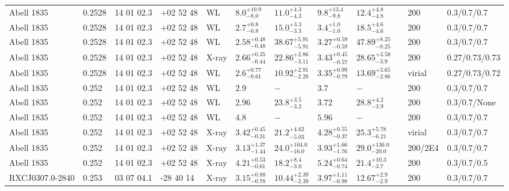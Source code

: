\begin{landscape}
\begin{center}
{\begin{longtable}{llllllllllll}
Abell 1835 & 0.2528 & 14 01 02.3 & +02 52 48 & WL & ${8.0}^{+10.9}_{-8.0}$ & ${11.0}^{+4.3}_{-4.3}$ & ${9.8}^{+13.4}_{-9.8}$ & ${12.4}^{+4.8}_{-4.8}$ & \citet{CO09.1} & 200 & 0.3/0.7/0.7 \\
Abell 1835 & 0.2528 & 14 01 02.3 & +02 52 48 & WL & ${2.7}^{+0.8}_{-0.8}$ & ${15.0}^{+3.3}_{-3.3}$ & ${3.4}^{+1.0}_{-1.0}$ & ${18.5}^{+4.6}_{-4.6}$ & \citet{SE14.1} & 200 & 0.3/0.7/0.7 \\
Abell 1835 & 0.2528 & 14 01 02.3 & +02 52 48 & WL & ${2.58}^{+0.48}_{-0.48}$ & ${38.67}^{+5.91}_{-5.91}$ & ${3.27}^{+0.59}_{-0.59}$ & ${47.89}^{+8.25}_{-8.25}$ & \citet{BA07.1} & 200 & 0.3/0.7/0.7 \\
Abell 1835 & 0.2528 & 14 01 02.3 & +02 52 48 & X-ray & ${2.66}^{+0.35}_{-0.44}$ & ${22.86}^{+2.86}_{-3.11}$ & ${3.43}^{+0.45}_{-0.57}$ & ${28.65}^{+3.58}_{-3.9}$ & \citet{BA14.1} & 200 & 0.27/0.73/0.73 \\
Abell 1835 & 0.2528 & 14 01 02.3 & +02 52 48 & WL & ${2.6}^{+0.77}_{-0.61}$ & ${10.92}^{+2.91}_{-2.28}$ & ${3.35}^{+0.99}_{-0.79}$ & ${13.69}^{+3.65}_{-2.86}$ & \citet{OK10.1} & virial & 0.27/0.73/0.72 \\
Abell 1835 & 0.252 & 14 01 02.3 & +02 52 48 & WL & ${2.9}^{}_{}$ & ${-}^{}_{}$ & ${3.7}^{}_{}$ & ${-}^{}_{}$ & \citet{CL03.1} & 200 & 0.3/0.7/0.7 \\
Abell 1835 & 0.252 & 14 01 02.3 & +02 52 48 & WL & ${2.96}^{}_{}$ & ${23.8}^{+3.5}_{-3.2}$ & ${3.72}^{}_{}$ & ${28.8}^{+4.2}_{-3.9}$ & \citet{CL02.1} & 200 & 0.3/0.7/None \\
Abell 1835 & 0.252 & 14 01 02.3 & +02 52 48 & WL & ${4.8}^{}_{}$ & ${-}^{}_{}$ & ${5.96}^{}_{}$ & ${-}^{}_{}$ & \citet{CL01.1} & 200 & 0.3/0.7/0.7 \\
Abell 1835 & 0.252 & 14 01 02.3 & +02 52 48 & X-ray & ${3.42}^{+0.45}_{-0.31}$ & ${21.2}^{+4.62}_{-5.03}$ & ${4.28}^{+0.55}_{-0.37}$ & ${25.3}^{+5.78}_{-6.21}$ & \citet{SC07.1} & virial & 0.3/0.7/0.7 \\
Abell 1835 & 0.252 & 14 01 02.3 & +02 52 48 & X-ray & ${3.13}^{+1.37}_{-1.44}$ & ${24.0}^{+104.0}_{-16.0}$ & ${3.93}^{+1.66}_{-1.76}$ & ${29.0}^{+136.0}_{-20.0}$ & \citet{VO06.1} & 200/2E4 & 0.3/0.7/0.7 \\
Abell 1835 & 0.252 & 14 01 02.3 & +02 52 48 & X-ray & ${4.21}^{+0.53}_{-0.61}$ & ${18.2}^{+8.4}_{-3.0}$ & ${5.24}^{+0.64}_{-0.74}$ & ${21.4}^{+10.3}_{-3.7}$ & \citet{AL03.1} & 200 & 0.3/0.7/0.5 \\
RXCJ0307.0-2840 & 0.253 & 03 07 04.1 & -28 40 14 & X-ray & ${3.15}^{+0.88}_{-0.78}$ & ${10.44}^{+2.39}_{-2.39}$ & ${3.97}^{+1.11}_{-0.98}$ & ${12.67}^{+2.9}_{-2.9}$ & \citet{ET11.1} & 200 & 0.3/0.7/0.7 \\

\end{longtable}}
\end{center}
\end{landscape}
